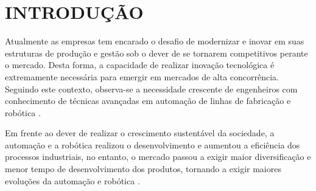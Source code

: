 \documentclass[12pt,oneside,a4paper, chapter=TITLE, section = TITLE, english, brazil]{abntex2}
\begin{document}

\tableofcontents*
\cleardoublepage




\textual

\chapter{INTRODUÇÃO} %

Atualmente as empresas tem encarado o desafio de modernizar e inovar em suas estruturas de produção e gestão sob o dever de se tornarem competitivos perante o mercado. Desta forma, a capacidade de realizar inovação tecnológica é extremamente necessária para emergir em mercados de alta concorrência. Seguindo este contexto, observa-se a necessidade crescente de engenheiros com conhecimento de técnicas avançadas em automação de linhas de fabricação e robótica \cite{rosario}.

Em frente ao dever de realizar o crescimento sustentável da sociedade, a automação e a robótica realizou o desenvolvimento e aumentou a eficiência dos processos industriais, no entanto, o mercado passou a exigir maior diversificação e menor tempo de desenvolvimento dos produtos, tornando a exigir maiores evoluções da automação e robótica \cite{rosario}.
\end{document}
